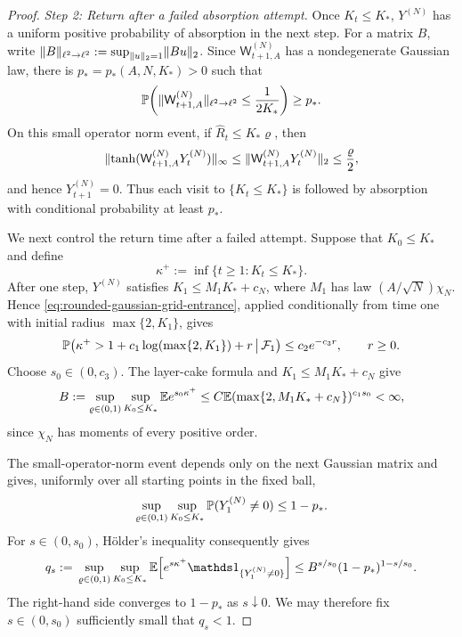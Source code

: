 \documentclass[11pt,reqno,a4paper]{article}
\newcommand{\Pp}{\P}
\newcommand{\Ee}{\E}
\begin{document}
\begin{proof}
  \emph{Step 2: Return after a failed absorption attempt.}
  Once $K_t\leq K_\ast$, $Y^{(N)}$ has a uniform positive probability of
  absorption in the next step. For a matrix $B$, write
  $\lVert B\rVert_{\ell^2\to\ell^2}:=
  \sup_{\lVert u\rVert_2=1}\lVert Bu\rVert_2$.
  Since $\mathsf W_{t+1,A}^{(N)}$ has a nondegenerate Gaussian law, there is
  $p_\ast=p_\ast(A,N,K_\ast)>0$ such that
  \begin{equation*}
    \Pp\left(\norm{\mathsf W_{t+1,A}^{(N)}}_{\ell^2\to\ell^2}
      \leq \frac1{2K_\ast}\right)
    \geq p_\ast.
  \end{equation*}
  On this small operator norm event, if $\widehat R_t\leq K_\ast\varrho$, then
  \begin{equation*}
    \lVert\tanh(\mathsf W_{t+1,A}^{(N)}Y_t^{(N)})\rVert_\infty
    \leq
    \lVert\mathsf W_{t+1,A}^{(N)}Y_t^{(N)}\rVert_2
    \leq
    \frac{\varrho}{2},
  \end{equation*}
  and hence $Y_{t+1}^{(N)}=0$. Thus each visit to
  $\{K_t\leq K_\ast\}$ is followed by absorption with conditional probability
  at least $p_\ast$.

  We next control the return time after a failed attempt. Suppose that
  $K_0\leq K_\ast$ and define
  \begin{equation*}
    \kappa^+:=\inf\{t\geq1:K_t\leq K_\ast\}.
  \end{equation*}
  After one step, $Y^{(N)}$ satisfies
  $K_1\leq M_1K_\ast+c_N$, where $M_1$ has law
  $(A/\sqrt N)\chi_N$. Hence
  \cref{eq:rounded-gaussian-grid-entrance}, applied conditionally from time one
  with initial radius $\max\{2,K_1\}$, gives
  \begin{equation*}
    \Pp\left(
      \kappa^+>1+c_1\log(\max\{2,K_1\})+r
      \,\middle|\,\mathcal F_1
    \right)
    \leq
    c_2e^{-c_3r},
    \qquad r\geq0.
  \end{equation*}
  Choose $s_0\in(0,c_3)$. The layer-cake formula and
  $K_1\leq M_1K_\ast+c_N$ give
  \begin{equation*}
    B
    :=
    \sup_{\varrho\in(0,1)}
    \sup_{K_0\leq K_\ast}
    \Ee e^{s_0\kappa^+}
    \leq
    C\Ee(\max\{2,M_1K_\ast+c_N\})^{c_1s_0}
    <\infty,
  \end{equation*}
  since $\chi_N$ has moments of every positive order.

  The small-operator-norm event depends only on the next Gaussian matrix and
  gives, uniformly over all starting points in the fixed ball,
  \begin{equation*}
    \sup_{\varrho\in(0,1)}
    \sup_{K_0\leq K_\ast}
    \Pp(Y_1^{(N)}\neq0)
    \leq
    1-p_\ast.
  \end{equation*}
  For $s\in(0,s_0)$, H\"older's inequality consequently gives
  \begin{equation*}
    q_s
    :={}
    \sup_{\varrho\in(0,1)}
    \sup_{K_0\leq K_\ast}
    \Ee\left[e^{s\kappa^+}\one_{\{Y_1^{(N)}\neq0\}}\right]
    \leq
    B^{s/s_0}(1-p_\ast)^{1-s/s_0}.
  \end{equation*}
  The right-hand side converges to $1-p_\ast$ as $s\downarrow0$. We may
  therefore fix $s\in(0,s_0)$ sufficiently small that $q_s<1$.


\end{proof}
\end{document}
